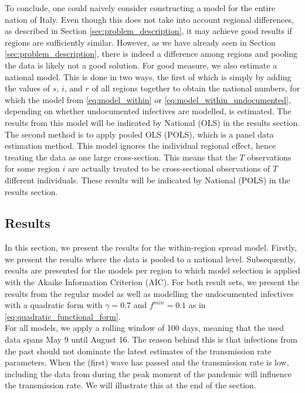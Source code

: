 \documentclass[12pt]{article}
\begin{document}
	To conclude, one could naively consider constructing a model for the entire nation of Italy. Even though this does not take into account regional differences, as described in Section \ref{sec:problem_description}, it may achieve good results if regions are sufficiently similar. However, as we have already seen in Section \ref{sec:problem_description}, there is indeed a difference among regions and pooling the data is likely not a good solution. For good measure, we also estimate a national model. This is done in two ways, the first of which is simply by adding the values of $s$, $i$, and $r$ of all regions together to obtain the national numbers, for which the model from \eqref{eq:model_within} or \eqref{eq:model_within_undocumented}, depending on whether undocumented infectives are modelled, is estimated. The results from this model will be indicated by National (OLS) in the results section. The second method is to apply pooled OLS (POLS), which is a panel data estimation method. This model ignores the individual regional effect, hence treating the data as one large cross-section. This means that the $T$ observations for some region $i$ are actually treated to be cross-sectional observations of $T$ different individuals. These results will be indicated by National (POLS) in the results section.
	
    \subsection{Results} \label{subsec:model_within_results}
	In this section, we present the results for the within-region spread model. Firstly, we present the results where the data is pooled to a national level. Subsequently, results are presented for the models per region to which model selection is applied with the Akaike Information Criterion (AIC). For both result sets, we present the results from the regular model as well as modelling the undocumented infectives with a quadratic form with $\gamma = 0.7$ and $f^{min} = 0.1$ as in \eqref{eq:quadratic_functional_form}. \\
	
	For all models, we apply a rolling window of 100 days, meaning that the used data spans May 9 until August 16. The reason behind this is that infections from the past should not dominate the latest estimates of the transmission rate parameters. When the (first) wave has passed and the transmission rate is low, including the data from during the peak moment of the pandemic will influence the transmission rate. We will illustrate this at the end of the section. \\
	
\end{document}
